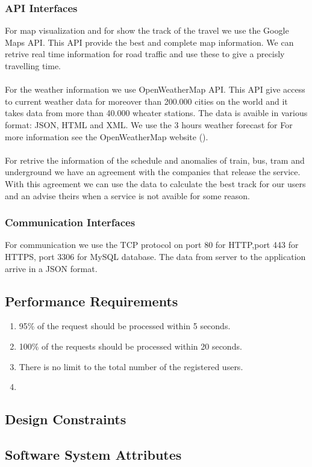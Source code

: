 \subsubsection{API Interfaces}
For map visualization and for show the track of the travel we use the Google Maps API. This API provide the best and complete map information. We can retrive real time information for road traffic and use these to give a precisly travelling time.\\
\\For the weather information we use OpenWeatherMap API. This API give access to current weather data for moreover than 200.000 cities on the world and it takes data from more than 40.000 wheater stations. The data is avaible in various format: JSON, HTML and XML. We use the 3 hours weather forecast for For more information see the OpenWeatherMap website ({\href{http://openweathermap.org/api}{\color{Black}{http://openweathermap.org/api}}}).
\\\\
For retrive the information of the schedule and anomalies of train, bus, tram and underground we have an agreement with the companies that release the service. With this agreement we can use the data to calculate the best track for our users and an advise theirs when a service is not avaible for some reason.

\subsubsection{Communication Interfaces}
For communication we use the TCP protocol on port 80 for HTTP,port 443 for HTTPS, port 3306 for MySQL database. The data from server to the application arrive in a JSON format.



\subsection{Performance Requirements}
\begin{enumerate}
\item
95\% of the request should be processed within 5 seconds.
\item
100\% of the requests should be processed within 20 seconds.
\item
There is no limit to the total number of the registered users.
\item

\end{enumerate}

\subsection{Design Constraints}

\subsection{Software System Attributes}
